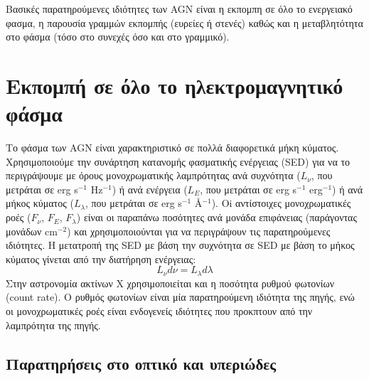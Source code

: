 Βασικές παρατηρούμενες ιδιότητες των \textlatin{AGN} είναι η εκπομπη σε όλο το ενεργειακό φασμα, η παρουσία γραμμών εκπομπής (ευρείες ή στενές) καθώς και η μεταβλητότητα στο φάσμα (τόσο στο συνεχές όσο και στο γραμμικό).

\section{Εκπομπή σε όλο το ηλεκτρομαγνητικό φάσμα}

Το φάσμα των \textlatin{AGN} είναι χαρακτηριστικό σε πολλά διαφορετικά μήκη κύματος. Χρησιμοποιούμε την συνάρτηση κατανομής φασματικής ενέργειας (\textlatin{SED}) για να το περιγράψουμε με όρους μονοχρωματικής λαμπρότητας ανά συχνότητα ($L_\nu$, που μετράται σε \textlatin{erg s}$^{-1}$ \textlatin{Hz}$^{-1}$) ή ανά ενέργεια ($L_E$, που μετράται σε \textlatin{erg s}$^{-1}$ \textlatin{erg}$^{-1}$) ή ανά μήκος κύματος ($L_\lambda$, που μετράται σε \textlatin{erg s}$^{-1}$ \AA$^{-1}$). Oi αντίστοιχες μονοχρωματικές ροές ($F_\nu$, $F_E$, $F_\lambda$) είναι οι παραπάνω ποσότητες ανά μονάδα επιφάνειας (παράγοντας μονάδων  \textlatin{cm}$^{-2}$) και χρησιμοποιούνται για να περιγράψουν τις παρατηρούμενες ιδιότητες. Η μετατροπή της \textlatin{SED} με βάση την συχνότητα σε \textlatin{SED} με βάση το μήκος κύματος γίνεται από την διατήρηση ενέργειας: $$ L_\nu d\nu  = L_\lambda d\lambda$$
Στην αστρονομία ακτίνων Χ χρησιμοποιείται και η ποσότητα ρυθμού φωτονίων (\textlatin{count rate})\cite{netzer_2013}. Ο ρυθμός φωτονίων είναι μία παρατηρούμενη ιδιότητα της πηγής, ενώ οι μονοχρωματικές ροές είναι ενδογενείς ιδιότητες που προκπτουν από την λαμπρότητα της πηγής.

\subsection*{Παρατηρήσεις στο οπτικό και υπεριώδες}


